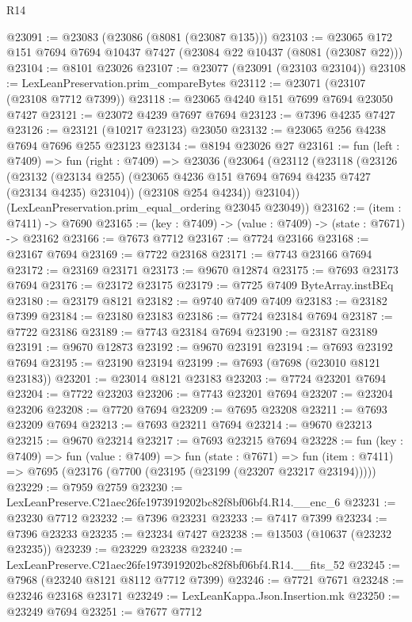 \begin{lexlean}{R14}
\begin{coremodule}
@23091 := @23083 (@23086 (@8081 (@23087 @135)))
@23103 := @23065 @172 @151 @7694 @7694 @10437 @7427 (@23084 @22 @10437 (@8081 (@23087 @22)))
@23104 := @8101 @23026
@23107 := @23077 (@23091 (@23103 @23104))
@23108 := LexLeanPreservation.prim_compareBytes
@23112 := @23071 (@23107 (@23108 @7712 @7399))
@23118 := @23065 @4240 @151 @7699 @7694 @23050 @7427
@23121 := @23072 @4239 @7697 @7694
@23123 := @7396 @4235 @7427
@23126 := @23121 (@10217 @23123) @23050
@23132 := @23065 @256 @4238 @7694 @7696 @255 @23123
@23134 := @8194 @23026 @27
@23161 := fun (left : @7409) =>
  fun (right : @7409) =>
  @23036
    (@23064
      (@23112
        (@23118
          (@23126
            (@23132 (@23134 @255) (@23065 @4236 @151 @7694 @7694 @4235 @7427 (@23134 @4235) @23104))
            (@23108 @254 @4234))
          @23104))
      (LexLeanPreservation.prim_equal_ordering @23045 @23049))
@23162 := (item : @7411) -> @7690
@23165 := (key : @7409) -> (value : @7409) -> (state : @7671) -> @23162
@23166 := @7673 @7712
@23167 := @7724 @23166
@23168 := @23167 @7694
@23169 := @7722 @23168
@23171 := @7743 @23166 @7694
@23172 := @23169 @23171
@23173 := @9670 @12874
@23175 := @7693 @23173 @7694
@23176 := @23172 @23175
@23179 := @7725 @7409 ByteArray.instBEq
@23180 := @23179 @8121
@23182 := @9740 @7409 @7409
@23183 := @23182 @7399
@23184 := @23180 @23183
@23186 := @7724 @23184 @7694
@23187 := @7722 @23186
@23189 := @7743 @23184 @7694
@23190 := @23187 @23189
@23191 := @9670 @12873
@23192 := @9670 @23191
@23194 := @7693 @23192 @7694
@23195 := @23190 @23194
@23199 := @7693 (@7698 (@23010 @8121 @23183))
@23201 := @23014 @8121 @23183
@23203 := @7724 @23201 @7694
@23204 := @7722 @23203
@23206 := @7743 @23201 @7694
@23207 := @23204 @23206
@23208 := @7720 @7694
@23209 := @7695 @23208
@23211 := @7693 @23209 @7694
@23213 := @7693 @23211 @7694
@23214 := @9670 @23213
@23215 := @9670 @23214
@23217 := @7693 @23215 @7694
@23228 := fun (key : @7409) =>
  fun (value : @7409) =>
  fun (state : @7671) =>
  fun (item : @7411) => @7695 (@23176 (@7700 (@23195 (@23199 (@23207 @23217 @23194)))))
@23229 := @7959 @2759
@23230 := LexLeanPreserve.C21aec26fe1973919202bc82f8bf06bf4.R14.__enc_6
@23231 := @23230 @7712
@23232 := @7396 @23231
@23233 := @7417 @7399
@23234 := @7396 @23233
@23235 := @23234 @7427
@23238 := @13503 (@10637 (@23232 @23235))
@23239 := @23229 @23238
@23240 := LexLeanPreserve.C21aec26fe1973919202bc82f8bf06bf4.R14.__fits_52
@23245 := @7968 (@23240 @8121 @8112 @7712 @7399)
@23246 := @7721 @7671
@23248 := @23246 @23168 @23171
@23249 := LexLeanKappa.Json.Insertion.mk
@23250 := @23249 @7694
@23251 := @7677 @7712

\end{coremodule}
\end{lexlean}
